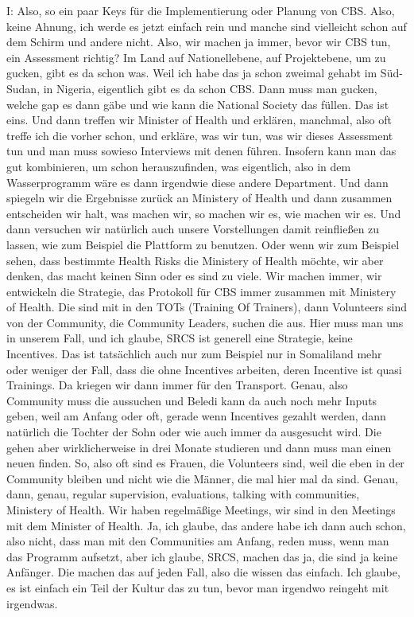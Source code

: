 I: Also, so ein paar Keys für die Implementierung oder Planung von CBS. Also, keine Ahnung, ich werde es jetzt einfach rein und manche sind vielleicht schon auf dem Schirm und andere nicht. Also, wir machen ja immer, bevor wir CBS tun, ein Assessment richtig? Im Land auf Nationellebene, auf Projektebene, um zu gucken, gibt es da schon was. Weil ich habe das ja schon zweimal gehabt im Süd-Sudan, in Nigeria, eigentlich gibt es da schon CBS. Dann muss man gucken, welche gap es dann gäbe und wie kann die National Society das füllen. Das ist eins. Und dann treffen wir Minister of Health und erklären, manchmal, also oft treffe ich die vorher schon, und erkläre, was wir tun, was wir dieses Assessment tun und man muss sowieso Interviews mit denen führen. Insofern kann man das gut kombinieren, um schon herauszufinden, was eigentlich, also in dem Wasserprogramm wäre es dann irgendwie diese andere Department. Und dann spiegeln wir die Ergebnisse zurück an Ministery of Health und dann zusammen entscheiden wir halt, was machen wir, so machen wir es, wie machen wir es. Und dann versuchen wir natürlich auch unsere Vorstellungen damit reinfließen zu lassen, wie zum Beispiel die Plattform zu benutzen. Oder wenn wir zum Beispiel sehen, dass bestimmte Health Risks die Ministery of Health möchte, wir aber denken, das macht keinen Sinn oder es sind zu viele. Wir machen immer, wir entwickeln die Strategie, das Protokoll für CBS immer zusammen mit Ministery of Health. Die sind mit in den TOTs (Training Of Trainers), dann Volunteers sind von der Community, die Community Leaders, suchen die aus. Hier muss man uns in unserem Fall, und ich glaube, SRCS ist generell eine Strategie, keine Incentives. Das ist tatsächlich auch nur zum Beispiel nur in Somaliland mehr oder weniger der Fall, dass die ohne Incentives arbeiten, deren Incentive ist quasi Trainings. Da kriegen wir dann immer für den Transport. Genau, also Community muss die aussuchen und Beledi kann da auch noch mehr Inputs geben, weil am Anfang oder oft, gerade wenn Incentives gezahlt werden, dann natürlich die Tochter der Sohn oder wie auch immer da ausgesucht wird. Die gehen aber wirklicherweise in drei Monate studieren und dann muss man einen neuen finden. So, also oft sind es Frauen, die Volunteers sind, weil die eben in der Community bleiben und nicht wie die Männer, die mal hier mal da sind. Genau, dann, genau, regular supervision, evaluations, talking with communities, Ministery of Health. Wir haben regelmäßige Meetings, wir sind in den Meetings mit dem Minister of Health. Ja, ich glaube, das andere habe ich dann auch schon, also nicht, dass man mit den Communities am Anfang, reden muss, wenn man das Programm aufsetzt, aber ich glaube, SRCS, machen das ja, die sind ja keine Anfänger. Die machen das auf jeden Fall, also die wissen das einfach. Ich glaube, es ist einfach ein Teil der Kultur das zu tun, bevor man irgendwo reingeht mit irgendwas. 

